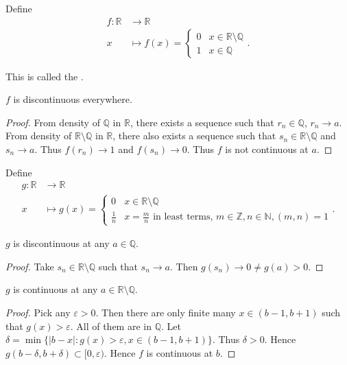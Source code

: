 \begin{example}
	Define
	\begin{align*}
		f: \mathbb{R} &\longrightarrow \mathbb{R} \\
		x &\longmapsto f(x) = \begin{cases}
			0 & x \in \mathbb{R}\setminus \mathbb{Q}\\
			1 & x \in \mathbb{Q}
		\end{cases}
	.\end{align*}

	This is called the .
	\begin{claim}
		$f$ is discontinuous everywhere.
	\end{claim}
	\begin{proof}
		From density of $\mathbb{Q}$ in $\mathbb{R}$, there exists a sequence such that $r_n \in \mathbb{Q}$, $r_n \to a$. From density of $\mathbb{R}\setminus \mathbb{Q}$ in $\mathbb{R}$, there also exists a sequence such that $s_n \in \mathbb{R}\setminus \mathbb{Q}$ and $s_n \to a$. Thus $f(r_n) \to 1$ and $f(s_n) \to 0$. Thus $f$ is not continuous at $a$.
	\end{proof}
\end{example}
\begin{example}
	Define
	\begin{align*}
		g: \mathbb{R} &\longrightarrow \mathbb{R} \\
		x &\longmapsto g(x) = \begin{cases}
			0 & x \in \mathbb{R}\setminus \mathbb{Q}\\
			\frac{1}{n} & x = \frac{m}{n} \text{ in least terms, }m \in \mathbb{Z}, n \in \mathbb{N}, (m,n) = 1
		\end{cases}
	.\end{align*}
	\begin{claim}
		$g$ is discontinuous at any $a \in \mathbb{Q}$.
	\end{claim}
	\begin{proof}
		Take $s_n \in \mathbb{R}\setminus \mathbb{Q}$ such that $s_n \to a$. Then $g(s_n) \to 0 \neq g(a) >0$.
	\end{proof}
	\begin{claim}
		$g$ is continuous at any $a \in \mathbb{R}\setminus \mathbb{Q}$.
	\end{claim}
	\begin{proof}
		Pick any $\varepsilon>0$. Then there are only finite many $x \in (b -1, b+1)$ such that $g(x) > \varepsilon$. All of them are in $\mathbb{Q}$. Let $\delta  = \min \{| b - x| : g(x) > \varepsilon, x \in (b-1, b+1)\} $. Thus $\delta > 0$. Hence $g(b - \delta, b + \delta) \subset [0,\varepsilon)$. Hence $f$ is continuous at $b$.
	\end{proof}
	
	                                                                  
	
\end{example}
